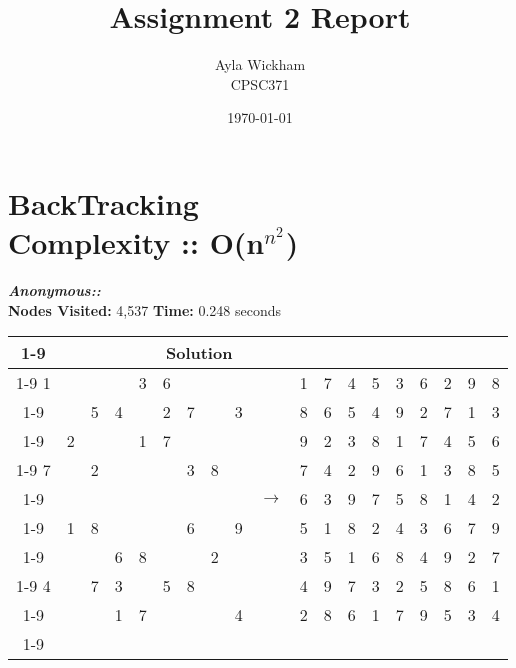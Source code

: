 \documentclass{article}
\begin{document}
\title{Assignment 2 Report}
\author{Ayla Wickham\\
  CPSC371}
\date{\today}

\maketitle
\newpage

\section*{BackTracking \\
\small{Complexity :: O(n$^{n^2}$)}}
\small\emph{\textbf{Anonymous::}}\\ \textbf{Nodes Visited:} 4,537 \textbf{Time:} 0.248 seconds\\
\begin{tabular}{||c|c|c||c|c|c||c|c|c|| c ||c|c|c||c|c|c||c|c|c||}
  \cmidrule{1-9} \cmidrule{11-19}
  \multicolumn{9}{|c|}{Problem} &                   & \multicolumn{9}{|c|}{Solution}   \\\cmidrule{1-9} \cmidrule{11-19} \morecmidrules \cmidrule{1-9} \cmidrule{11-19}
  1 &   &   &   & 3 & 6 &   &   &   &               & 1 & 7 & 4 & 5 & 3 & 6 & 2 & 9 & 8\\\cmidrule{1-9} \cmidrule{11-19}
    &   & 5 & 4 &   & 2 & 7 &   & 3 &               & 8 & 6 & 5 & 4 & 9 & 2 & 7 & 1 & 3\\\cmidrule{1-9} \cmidrule{11-19}
    & 2 &   &   & 1 & 7 &   &   &   &               & 9 & 2 & 3 & 8 & 1 & 7 & 4 & 5 & 6\\\cmidrule{1-9} \cmidrule{11-19} \morecmidrules \cmidrule{1-9} \cmidrule{11-19}
  7 &   & 2 &   &   &   & 3 & 8 &   &               & 7 & 4 & 2 & 9 & 6 & 1 & 3 & 8 & 5\\\cmidrule{1-9} \cmidrule{11-19}
    &   &   &   &   &   &   &   &   & $\rightarrow$ & 6 & 3 & 9 & 7 & 5 & 8 & 1 & 4 & 2\\\cmidrule{1-9} \cmidrule{11-19}
    & 1 & 8 &   &   &   & 6 &   & 9 &               & 5 & 1 & 8 & 2 & 4 & 3 & 6 & 7 & 9\\\cmidrule{1-9} \cmidrule{11-19} \morecmidrules \cmidrule{1-9} \cmidrule{11-19}
    &   &   & 6 & 8 &   &   & 2 &   &               & 3 & 5 & 1 & 6 & 8 & 4 & 9 & 2 & 7\\\cmidrule{1-9} \cmidrule{11-19}
  4 &   & 7 & 3 &   & 5 & 8 &   &   &               & 4 & 9 & 7 & 3 & 2 & 5 & 8 & 6 & 1\\\cmidrule{1-9} \cmidrule{11-19}
    &   &   & 1 & 7 &   &   &   & 4 &               & 2 & 8 & 6 & 1 & 7 & 9 & 5 & 3 & 4\\\cmidrule{1-9} \cmidrule{11-19} \morecmidrules \cmidrule{1-9} \cmidrule{11-19}
\end{tabular}
\end{document}
